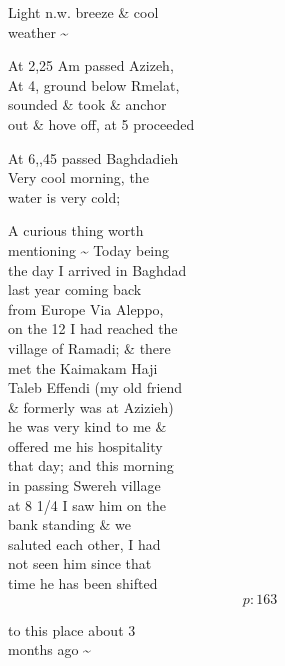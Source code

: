 \documentclass{report}
\begin{document}
	\par{
 	Light n.w. breeze \& cool\ \\weather \~{}\ \\
	}

	\par{
 	At 2,25 Am passed Azizeh,\ \\At 4, ground below Rmelat,\ \\sounded \& took \& anchor\ \\out \& hove off, at 5 proceeded\ \\
	}

	\par{
 	At 6,,45 passed Baghdadieh\ \\Very cool morning, the\ \\water is very cold;\ \\
	}

	\par{
 	A curious thing worth\ \\mentioning \~{} Today being\ \\the day I arrived in Baghdad\ \\last year coming back\ \\from Europe Via Aleppo,\ \\on the 12 I had reached the\ \\village of Ramadi; \& there\ \\met the Kaimakam Haji\ \\Taleb Effendi (my old friend\ \\\& formerly was at Azizieh)\ \\he was very kind to me \&\ \\offered me his hospitality\ \\that day; and this morning\ \\in passing Swereh village\ \\at 8 1/4 I saw him on the\ \\bank standing \& we\ \\saluted each other, I had\ \\not seen him since that\ \\time he has been shifted\ \\
  \[p: 163 \]

	}


	\par{
 	to this place about 3\ \\months ago \~{}\ \\
	}
\end{document}
